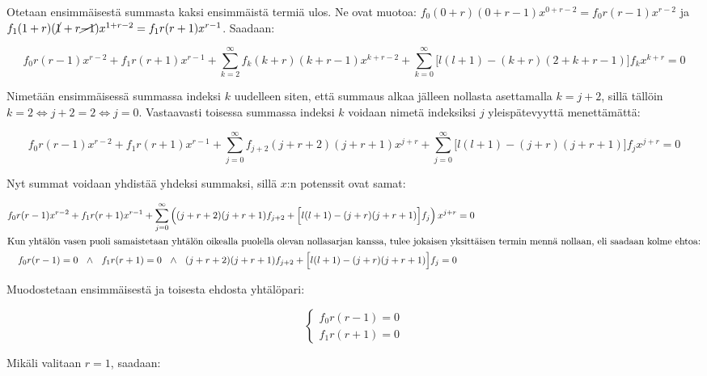 \documentclass[../johdoksia.tex]{subfiles}
\begin{document}
	\noindent Otetaan ensimmäisestä summasta kaksi ensimmäistä termiä ulos. Ne ovat muotoa: $f_0(0 + r)(0 + r - 1)x^{0 + r - 2} = f_0r(r - 1)x^{r - 2}$ ja $f_1(1 + r)(\cancel{1} + r \cancel{- 1})x^{1 + r - 2} = f_1r(r + 1)x^{r - 1}$. Saadaan:

	\begin{equation*}
		f_0r(r - 1)x^{r - 2} + f_1r(r + 1)x^{r - 1} + \sum_{k = 2}^{\infty}f_k(k + r)(k + r - 1)x^{k + r - 2} + \sum_{k = 0}^{\infty}\Big[l(l + 1) - (k + r)(2 + k + r - 1)\Big]f_kx^{k + r} = 0
	\end{equation*}

	\noindent Nimetään ensimmäisessä summassa indeksi $k$ uudelleen siten, että summaus alkaa jälleen nollasta asettamalla $k = j + 2$, sillä tällöin $k = 2 \iff j + 2 = 2 \iff j = 0$. Vastaavasti toisessa summassa indeksi $k$ voidaan nimetä indeksiksi $j$ yleispätevyyttä menettämättä:
	
	\begin{equation*}
		f_0r(r - 1)x^{r - 2} + f_1r(r + 1)x^{r - 1} + \sum_{j = 0}^{\infty}f_{j + 2}(j + r + 2)(j + r + 1)x^{j + r} + \sum_{j = 0}^{\infty}\Big[l(l + 1) - (j + r)(j + r + 1)\Big]f_{j}x^{j + r} = 0
	\end{equation*}
	
	\noindent Nyt summat voidaan yhdistää yhdeksi summaksi, sillä $x$:n potenssit ovat samat:
	
	\begin{align*}
		f_0r(r - 1)x^{r - 2} + f_1r(r + 1)x^{r - 1} + \sum_{j = 0}^{\infty}\left((j + r + 2)(j + r + 1)f_{j + 2} + \Big[l(l + 1) - (j + r)(j + r + 1)\Big]f_{j}\right)x^{j + r} &= 0 \\
		\intertext{Kun yhtälön vasen puoli samaistetaan yhtälön oikealla puolella olevan nollasarjan kanssa, tulee jokaisen yksittäisen termin mennä nollaan, eli saadaan kolme ehtoa:}
		f_0r(r - 1) = 0 \ \ \land \ \ f_1r(r + 1) = 0 \ \ \land \ \ (j + r + 2)(j + r + 1)f_{j + 2} + \Big[l(l + 1) - (j + r)(j + r + 1)\Big]f_{j} = 0
	\end{align*}
	
	\noindent Muodostetaan ensimmäisestä ja toisesta ehdosta yhtälöpari:
	
	\begin{equation*}
		\begin{cases}
			f_0r(r - 1) = 0 \\
			f_1r(r + 1) = 0
		\end{cases}
	\end{equation*}

	Mikäli valitaan $r = 1$, saadaan:
	
\end{document}
